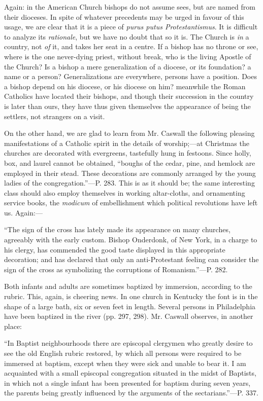 Again: in the American Church bishops do not
assume sees, but are named from their dioceses. In spite of whatever
precedents may be urged in favour of this usage, we are clear that it
is a piece of \emph{purus putus Protestantismus}. It is difficult to
analyze its \emph{rationale}, but we have no doubt that so it
is. The Church is \emph{in} a country, not \emph{of} it, and takes her
seat in a centre. If a bishop has no throne or see, where is the one
never-dying priest, without break, who is the living Apostle of the
Church? Is a bishop a mere generalization of a diocese, or its
foundation? a name or a person? Generalizations are everywhere,
persons have a position. Does a bishop depend on his diocese, or his
diocese on him? meanwhile the Roman Catholics have located their
bishops, and though their succession in the country is later than
ours, they have thus given themselves the appearance of being the
settlers, not strangers on a visit.

On the other hand, we are glad to learn from Mr.
Caswall the following pleasing manifestations of a Catholic spirit in
the details of worship;—at Christmas the churches are decorated with
evergreens, tastefully hung in festoons. Since holly, box, and laurel
cannot be obtained, ``boughs of the cedar, pine, and hemlock are
employed in their stead. These decorations are commonly arranged by
the young ladies of the congregation.''—P. 283. This is as it should
be; the same interesting class should also employ themselves in
working altar-cloths, and ornamenting service books, the \emph{modicum}
of embellishment which political revolutions have left us. Again:—

``The
sign of the cross has lately made its appearance on many churches,
agreeably with the early custom. Bishop Onderdonk, of New York, in a
charge to his clergy, has commended the good taste displayed in this
appropriate decoration; and has declared that only an anti-Protestant
feeling can consider the sign of the cross as symbolizing the
corruptions of Romanism.''—P. 282.

Both infants and adults are sometimes baptized by
immersion, according to the rubric. This, again, is cheering news. In
one church in Kentucky the font is in the shape of a large bath,
six or seven feet in length. Several persons in Philadelphia have been
baptized in the river (pp. 297, 298). Mr. Caswall observes, in another
place:

``In
Baptist neighbourhoods there are episcopal clergymen who greatly
desire to see the old English rubric restored, by which all persons
were required to be immersed at baptism, except when they were sick
and unable to bear it. I am acquainted with a small episcopal
congregation situated in the midst of Baptists, in which not a single
infant has been presented for baptism during seven years, the parents
being greatly influenced by the arguments of the sectarians.''—P.
337.

